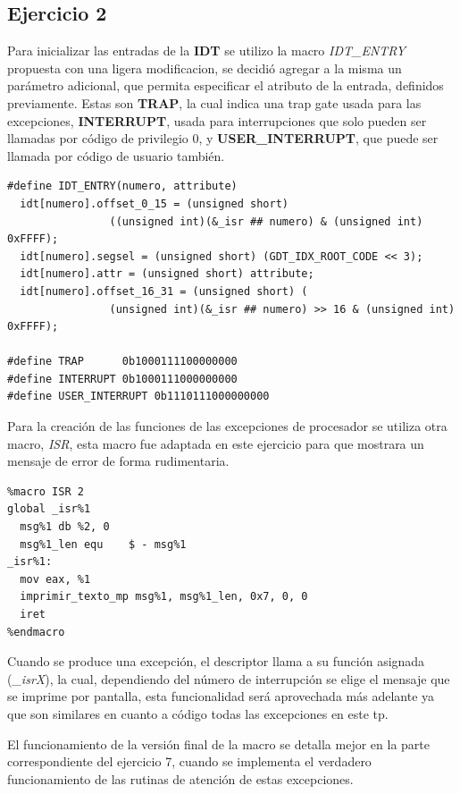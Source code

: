 \subsection{Ejercicio 2}

Para inicializar las entradas de la {\bf IDT} se utilizo la macro {\it IDT_ENTRY\/}
propuesta con una ligera modificacion, se decidió agregar a la misma un
parámetro adicional, que permita especificar el atributo de la entrada,
definidos previamente.
Estas son {\bf TRAP}, la cual indica una trap gate usada para
las excepciones, {\bf INTERRUPT}, usada para interrupciones que solo pueden ser
llamadas por código de privilegio 0, y {\bf USER_INTERRUPT}, que puede ser llamada
por código de usuario también.

\begin{lstlisting}
#define IDT_ENTRY(numero, attribute)
  idt[numero].offset_0_15 = (unsigned short)
                ((unsigned int)(&_isr ## numero) & (unsigned int) 0xFFFF);
  idt[numero].segsel = (unsigned short) (GDT_IDX_ROOT_CODE << 3);
  idt[numero].attr = (unsigned short) attribute;
  idt[numero].offset_16_31 = (unsigned short) (
                (unsigned int)(&_isr ## numero) >> 16 & (unsigned int) 0xFFFF);

#define TRAP      0b1000111100000000
#define INTERRUPT 0b1000111000000000
#define USER_INTERRUPT 0b1110111000000000
\end{lstlisting}

Para la creación de las funciones de las excepciones de procesador se utiliza
otra macro, {\it ISR\/}, esta macro fue adaptada en este ejercicio para que
mostrara un mensaje de error de forma rudimentaria.

\begin{lstlisting}
%macro ISR 2
global _isr%1
  msg%1 db %2, 0
  msg%1_len equ    $ - msg%1
_isr%1:
  mov eax, %1
  imprimir_texto_mp msg%1, msg%1_len, 0x7, 0, 0
  iret
%endmacro
\end{lstlisting}

Cuando se produce una excepción, el descriptor llama a su función asignada
({\it _isrX\/}), la cual, dependiendo del número de interrupción se elige el
mensaje que se imprime por pantalla, esta funcionalidad será aprovechada más
adelante ya que son similares en cuanto a código todas las excepciones en este
tp.

El funcionamiento de la versión final de la macro se detalla mejor en la parte
correspondiente del ejercicio 7, cuando se implementa el verdadero
funcionamiento de las rutinas de atención
de estas excepciones.


